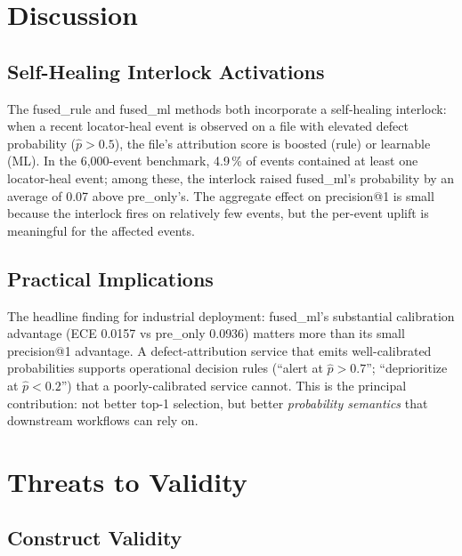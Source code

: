 \documentclass[10pt,twocolumn,letterpaper]{article}
\begin{document}
\section{Discussion}
\label{sec:discussion}

\subsection{Self-Healing Interlock Activations}

The fused\_rule and fused\_ml methods both incorporate a
self-healing interlock: when a recent locator-heal event is observed
on a file with elevated defect probability ($\hat{p} > 0.5$), the
file's attribution score is boosted (rule) or learnable (ML). In
the 6{,}000-event benchmark, 4.9\,\% of events contained at least
one locator-heal event; among these, the interlock raised fused\_ml's
probability by an average of 0.07 above pre\_only's. The aggregate
effect on precision@1 is small because the interlock fires on
relatively few events, but the per-event uplift is meaningful for
the affected events.

\subsection{Practical Implications}

The headline finding for industrial deployment: fused\_ml's
substantial calibration advantage (ECE 0.0157 vs pre\_only 0.0936)
matters more than its small precision@1 advantage. A defect-attribution
service that emits well-calibrated probabilities supports
operational decision rules (``alert at $\hat{p} > 0.7$''; ``deprioritize
at $\hat{p} < 0.2$'') that a poorly-calibrated service cannot. This
is the principal contribution: not better top-1 selection, but better
\emph{probability semantics} that downstream workflows can rely on.

\section{Threats to Validity}
\label{sec:threats}

\subsection{Construct Validity}
\end{document}

